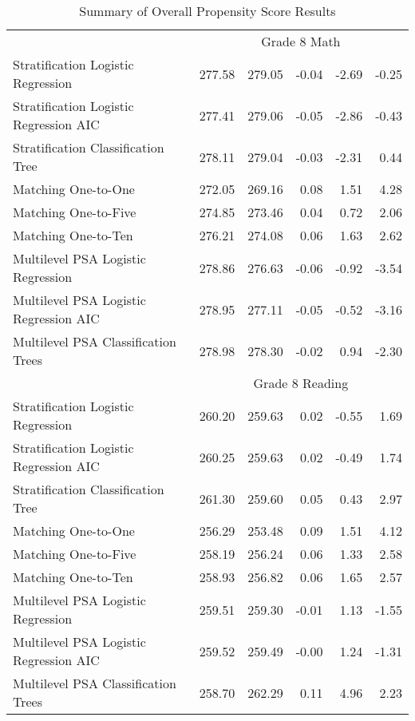 \begin{table}[ht]
\begin{tabular}{lrrrrr}
    \hline & \multicolumn{5}{c}{Grade 8 Math} \\ \cline{2-6} Stratification Logistic Regression & 277.58 & 279.05 & -0.04 & -2.69 & -0.25 \\ 
  Stratification Logistic Regression AIC & 277.41 & 279.06 & -0.05 & -2.86 & -0.43 \\ 
  Stratification Classification Tree & 278.11 & 279.04 & -0.03 & -2.31 & 0.44 \\ 
  Matching One-to-One & 272.05 & 269.16 & 0.08 & 1.51 & 4.28 \\ 
  Matching One-to-Five & 274.85 & 273.46 & 0.04 & 0.72 & 2.06 \\ 
  Matching One-to-Ten & 276.21 & 274.08 & 0.06 & 1.63 & 2.62 \\ 
  Multilevel PSA Logistic Regression & 278.86 & 276.63 & -0.06 & -0.92 & -3.54 \\ 
  Multilevel PSA Logistic Regression AIC & 278.95 & 277.11 & -0.05 & -0.52 & -3.16 \\ 
  Multilevel PSA Classification Trees & 278.98 & 278.30 & -0.02 & 0.94 & -2.30 \\ 
    \hline & \multicolumn{5}{c}{Grade 8 Reading} \\ \cline{2-6} Stratification Logistic Regression & 260.20 & 259.63 & 0.02 & -0.55 & 1.69 \\ 
  Stratification Logistic Regression AIC & 260.25 & 259.63 & 0.02 & -0.49 & 1.74 \\ 
  Stratification Classification Tree & 261.30 & 259.60 & 0.05 & 0.43 & 2.97 \\ 
  Matching One-to-One & 256.29 & 253.48 & 0.09 & 1.51 & 4.12 \\ 
  Matching One-to-Five & 258.19 & 256.24 & 0.06 & 1.33 & 2.58 \\ 
  Matching One-to-Ten & 258.93 & 256.82 & 0.06 & 1.65 & 2.57 \\ 
  Multilevel PSA Logistic Regression & 259.51 & 259.30 & -0.01 & 1.13 & -1.55 \\ 
  Multilevel PSA Logistic Regression AIC & 259.52 & 259.49 & -0.00 & 1.24 & -1.31 \\ 
  Multilevel PSA Classification Trees & 258.70 & 262.29 & 0.11 & 4.96 & 2.23 \\ 
   \hline
\end{tabular}
\caption{Summary of Overall Propensity Score Results} 
\label{tab:overall}
\end{table}
